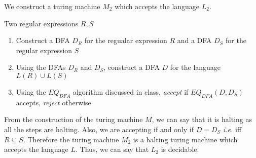 \documentclass{article}
\begin{document}
\begin{question}
\begin{qpart}{2}
		We construct a turing machine $M_2$ which accepts the language $L_2$. \br%

		 \br%
		\begin{margin}
			 Two regular expressions $R, S$

			\begin{enumerate}
				\item Construct a DFA $D_R$ for the regualar expression $R$ and a DFA $D_S$ for the regular expression $S$
				\item Using the DFAs $D_R$ and $D_S$, construct a DFA $D$ for the language $L(R) \cup L(S)$
				\item Using the $EQ_{DFA}$ algorithm discussed in class, \textit{accept} if $EQ_{DFA}(D, D_S)$ accepts, \textit{reject} otherwise
			\end{enumerate}
		\end{margin}

		From the construction of the turing machine $M$, we can say that it is halting as all the steps are halting. Also, we are accepting if and only if $D = D_S$ \textit{i.e.} iff $R \subseteq S$. Therefore the turing machine $M_2$ is a halting turing machine which accepts the language $L$. Thus, we can say that $L_2$ is decidable.
		
	\end{qpart}
	
\end{question}
\end{document}
